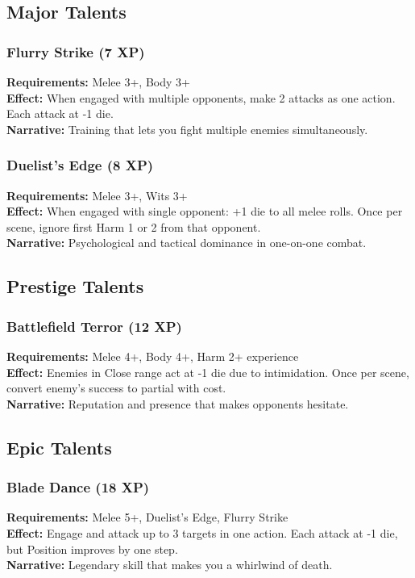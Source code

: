 \subsection{Major Talents}

\subsubsection{Flurry Strike (7 XP)}
\textbf{Requirements:} Melee 3+, Body 3+ \\
\textbf{Effect:} When engaged with multiple opponents, make 2 attacks as one action. Each attack at -1 die. \\
\textbf{Narrative:} Training that lets you fight multiple enemies simultaneously.

\subsubsection{Duelist's Edge (8 XP)}
\textbf{Requirements:} Melee 3+, Wits 3+ \\
\textbf{Effect:} When engaged with single opponent: +1 die to all melee rolls. Once per scene, ignore first Harm 1 or 2 from that opponent. \\
\textbf{Narrative:} Psychological and tactical dominance in one-on-one combat.

\subsection{Prestige Talents}

\subsubsection{Battlefield Terror (12 XP)}
\textbf{Requirements:} Melee 4+, Body 4+, Harm 2+ experience \\
\textbf{Effect:} Enemies in Close range act at -1 die due to intimidation. Once per scene, convert enemy's success to partial with cost. \\
\textbf{Narrative:} Reputation and presence that makes opponents hesitate.

\subsection{Epic Talents}

\subsubsection{Blade Dance (18 XP)}
\textbf{Requirements:} Melee 5+, Duelist's Edge, Flurry Strike \\
\textbf{Effect:} Engage and attack up to 3 targets in one action. Each attack at -1 die, but Position improves by one step. \\
\textbf{Narrative:} Legendary skill that makes you a whirlwind of death.


